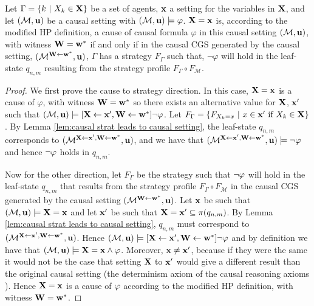 \begin{proposition}\label{prop:cause iff strat}
    Let $\Gamma = \{ {k \ | \ X_k \in \mathbf{X}} \}$ be a set of agents, $\mathbf{x}$ a setting for the variables in $\mathbf{X}$, and let $(\mathcal{M},\mathbf{u})$ be a causal setting with $(\mathcal{M},\mathbf{u})\models \varphi$. 
    $\mathbf{X} = \mathbf{x}$ is, according to the modified HP definition, a cause of causal formula $\varphi$ in this causal setting $(\mathcal{M},\mathbf{u})$, with witness $\mathbf{W} = \mathbf{w}^*$ if and only if in the causal CGS generated by the causal setting, $(\mathcal{M}^{\mathbf{W} \leftarrow \mathbf{w}^*},\mathbf{u})$, $\Gamma$ has a strategy $F_\Gamma$ such that, $\neg \varphi$ will hold in the leaf-state $q_{n,m}$ resulting from the strategy profile $F_\Gamma \circ F_\mathcal{M}$.
\end{proposition}
\begin{proof}
    We first prove the cause to strategy direction.
    In this case, $\mathbf{X} = \mathbf{x}$ is a cause of $\varphi$, with witness $\mathbf{W} = \mathbf{w}^*$ so there exists an alternative value for $\mathbf{X}$, $\mathbf{x}'$ such that $(\mathcal{M},\mathbf{u}) \models [\mathbf{X} \leftarrow \mathbf{x}', \mathbf{W} \leftarrow \mathbf{w}^*] \neg \varphi$.
    Let $F_\Gamma = \{F_{X_k = x} \ | \ x \in \mathbf{x}' \text{ if } X_k \in \mathbf{X}\}$. 
    By Lemma \ref{lem:causal strat leads to causal setting}, the leaf-state $q_{n,m}$ corresponds to $(\mathcal{M}^{\mathbf{X} \leftarrow \mathbf{x}',\mathbf{W}\leftarrow \mathbf{w}^*},\mathbf{u})$, and we have that $(\mathcal{M}^{\mathbf{X} \leftarrow \mathbf{x}', \mathbf{W}\leftarrow\mathbf{w}^*},\mathbf{u})\models\neg \varphi$ and hence $\neg \varphi$ holds in $q_{n,m}$.
    
    Now for the other direction, let $F_\Gamma$ be the strategy such that $\neg \varphi$ will hold in the leaf-state $q_{n,m}$ that results from the strategy profile $F_\Gamma \circ F_{\mathcal{M}}$ in the causal CGS generated by the causal setting $(\mathcal{M}^{\mathbf{W}\leftarrow\mathbf{w}^*},\mathbf{u})$.
    Let $\mathbf{x}$ be such that $(\mathcal{M},\mathbf{u}) \models \mathbf{X} = \mathbf{x}$ and let $\mathbf{x}'$ be such that $\mathbf{X} = \mathbf{x}'\subseteq \pi(q_{n,m})$. By Lemma \ref{lem:causal strat leads to causal setting}, $q_{n,m}$ must correspond to $(\mathcal{M}^{\mathbf{X}\leftarrow\mathbf{x}', \mathbf{W} \leftarrow \mathbf{w}^*},\mathbf{u})$. Hence $(\mathcal{M},\mathbf{u}) \models [\mathbf{X} \leftarrow \mathbf{x}', \mathbf{W} \leftarrow \mathbf{w}^*]\neg \varphi$ and by definition we have that $(\mathcal{M},\mathbf{u}) \models \mathbf{X} = \mathbf{x} \wedge \varphi$. Moreover, $\mathbf{x} \neq \mathbf{x}'$, because if they were the same it would not be the case that setting $\mathbf{X}$ to $\mathbf{x}'$ would give a different result than the original causal setting (the determinism axiom of the causal reasoning axioms \cite{halpern2016actual}). Hence $\mathbf{X} = \mathbf{x}$ is a cause of $\varphi$ according to the modified HP definition, with witness $\mathbf{W} = \mathbf{w}^*$.
\end{proof}

